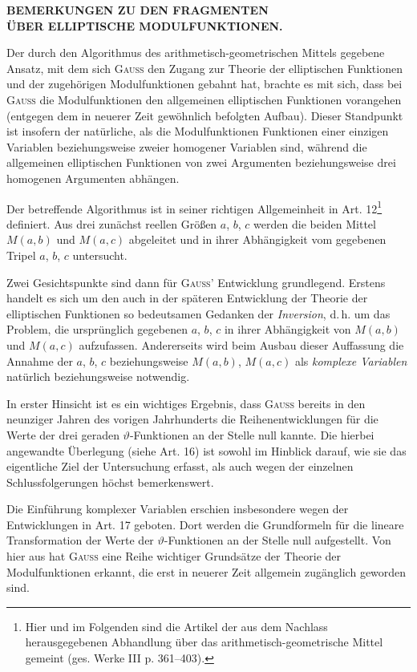 \enlargethispage{2pt}

\begin{center}\textbf{BEMERKUNGEN ZU DEN FRAGMENTEN\\ ÜBER ELLIPTISCHE MODULFUNKTIONEN.}\end{center}

Der durch den Algorithmus des arithmetisch-geometrischen Mittels gegebene Ansatz, mit dem sich \textsc{Gauss} den Zugang zur Theorie der elliptischen Funktionen und der zugehörigen Modulfunktionen gebahnt hat, brachte es mit sich, dass bei \textsc{Gauss} die Modulfunktionen den allgemeinen elliptischen Funktionen vorangehen (entgegen dem in neuerer Zeit gewöhnlich befolgten Aufbau). Dieser Standpunkt ist insofern der natürliche, als die Modulfunktionen Funktionen einer einzigen Variablen beziehungsweise zweier homogener Variablen sind, während die allgemeinen elliptischen Funktionen von zwei Argumenten beziehungsweise drei homogenen Argumenten abhängen.

Der betreffende Algorithmus ist in seiner richtigen Allgemeinheit in Art. 12\footnote{Hier und im Folgenden sind die Artikel der aus dem Nachlass herausgegebenen Abhandlung über das arithmetisch-geometrische Mittel gemeint (ges. Werke III p. 361--403).} definiert. Aus drei zunächst reellen Größen $a$, $b$, $c$ werden die beiden Mittel $M(a,b)$ und $M(a,c)$ abgeleitet und in ihrer Abhängigkeit vom gegebenen Tripel $a$, $b$, $c$ untersucht.

Zwei Gesichtspunkte sind dann für \textsc{Gauss}’ Entwicklung grundlegend. Erstens handelt es sich um den auch in der späteren Entwicklung der Theorie der elliptischen Funktionen so bedeutsamen Gedanken der \emph{Inversion}, d.\,h. um das Problem, die ursprünglich gegebenen $a$, $b$, $c$ in ihrer Abhängigkeit von $M(a,b)$ und $M(a,c)$ aufzufassen. Andererseits wird beim Ausbau dieser Auffassung die Annahme der $a$, $b$, $c$ beziehungsweise $M(a,b)$, $M(a,c)$ als \emph{komplexe Variablen} natürlich beziehungsweise notwendig.

In erster Hinsicht ist es ein wichtiges Ergebnis, dass \textsc{Gauss} bereits in den neunziger Jahren des vorigen Jahrhunderts die Reihenentwicklungen für die Werte der drei geraden $\vartheta$-Funktionen an der Stelle null kannte. Die hierbei angewandte Überlegung (siehe Art. 16) ist sowohl im Hinblick darauf, wie sie das eigentliche Ziel der Untersuchung erfasst, als auch wegen der einzelnen Schlussfolgerungen höchst bemerkenswert.

Die Einführung komplexer Variablen erschien insbesondere wegen der Entwicklungen in Art. 17 geboten. Dort werden die Grundformeln für die lineare Transformation der Werte der $\vartheta$-Funktionen an der Stelle null aufgestellt. Von hier aus hat \textsc{Gauss} eine Reihe wichtiger Grundsätze der Theorie der Modulfunktionen erkannt, die erst in neuerer Zeit allgemein zugänglich geworden sind.

